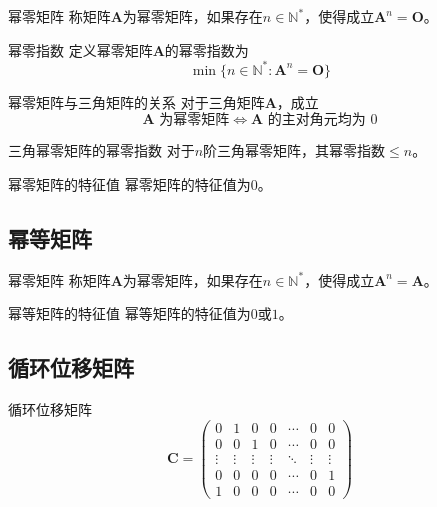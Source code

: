 \documentclass[lang = cn, scheme = chinese, thmcnt = section]{elegantbook}
\newcommand{\N}{\mathbb{N}}            %
\newcommand{\bs}{\boldsymbol}          %
\begin{document}
\begin{definition}{幂零矩阵}
	称矩阵$\bs{A}$为幂零矩阵，如果存在$n\in\N^*$，使得成立$\bs{A}^n=\bs{O}$。
\end{definition}

\begin{definition}{幂零指数}
	定义幂零矩阵$\bs{A}$的幂零指数为
	$$
	\min\{ n\in\N^*:\bs{A}^n=\bs{O} \}
	$$
\end{definition}

\begin{proposition}{幂零矩阵与三角矩阵的关系}
	对于三角矩阵$\bs{A}$，成立
	$$
	\bs{A}\text{ 为幂零矩阵}\iff
	\bs{A}\text{ 的主对角元均为 }0
	$$
\end{proposition}

\begin{proposition}{三角幂零矩阵的幂零指数}
	对于$n$阶三角幂零矩阵，其幂零指数$\le n$​。
\end{proposition}

\begin{proposition}{幂零矩阵的特征值}
	幂零矩阵的特征值为$0$。
\end{proposition}

\subsection{幂等矩阵}

\begin{definition}{幂零矩阵}
	称矩阵$\bs{A}$为幂零矩阵，如果存在$n\in\N^*$，使得成立$\bs{A}^n=\bs{A}$。
\end{definition}

\begin{proposition}{幂等矩阵的特征值}
	幂等矩阵的特征值为$0$或$1$。
\end{proposition}

\subsection{循环位移矩阵}

\begin{definition}{循环位移矩阵}
	$$
	\bs{C}=
	\begin{pmatrix}
		0 & 1 & 0 & 0 & \cdots & 0 & 0\\
		0 & 0 & 1 & 0 & \cdots & 0 & 0\\
		\vdots & \vdots & \vdots & \vdots & \ddots & \vdots & \vdots\\
		0 & 0 & 0 & 0 & \cdots & 0 & 1\\
		1 & 0 & 0 & 0 & \cdots & 0 & 0
	\end{pmatrix}
	$$
\end{definition}
\end{document}
